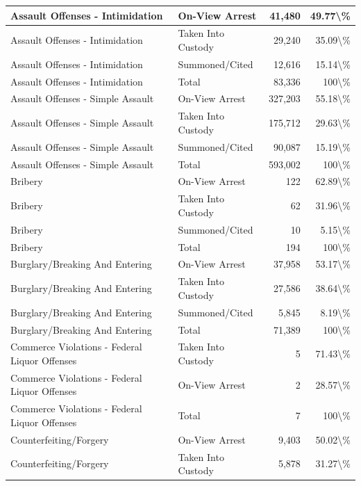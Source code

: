 \documentclass[
]{krantz}
\begin{document}
\begin{longtable}[t]{l|l|r|r}
\hline
Assault Offenses - Intimidation & On-View Arrest & 41,480 & 49.77\textbackslash{}\%\\
\hline
Assault Offenses - Intimidation & Taken Into Custody & 29,240 & 35.09\textbackslash{}\%\\
\hline
Assault Offenses - Intimidation & Summoned/Cited & 12,616 & 15.14\textbackslash{}\%\\
\hline
Assault Offenses - Intimidation & Total & 83,336 & 100\textbackslash{}\%\\
\hline
Assault Offenses - Simple Assault & On-View Arrest & 327,203 & 55.18\textbackslash{}\%\\
\hline
Assault Offenses - Simple Assault & Taken Into Custody & 175,712 & 29.63\textbackslash{}\%\\
\hline
Assault Offenses - Simple Assault & Summoned/Cited & 90,087 & 15.19\textbackslash{}\%\\
\hline
Assault Offenses - Simple Assault & Total & 593,002 & 100\textbackslash{}\%\\
\hline
Bribery & On-View Arrest & 122 & 62.89\textbackslash{}\%\\
\hline
Bribery & Taken Into Custody & 62 & 31.96\textbackslash{}\%\\
\hline
Bribery & Summoned/Cited & 10 & 5.15\textbackslash{}\%\\
\hline
Bribery & Total & 194 & 100\textbackslash{}\%\\
\hline
Burglary/Breaking And Entering & On-View Arrest & 37,958 & 53.17\textbackslash{}\%\\
\hline
Burglary/Breaking And Entering & Taken Into Custody & 27,586 & 38.64\textbackslash{}\%\\
\hline
Burglary/Breaking And Entering & Summoned/Cited & 5,845 & 8.19\textbackslash{}\%\\
\hline
Burglary/Breaking And Entering & Total & 71,389 & 100\textbackslash{}\%\\
\hline
Commerce Violations - Federal Liquor Offenses & Taken Into Custody & 5 & 71.43\textbackslash{}\%\\
\hline
Commerce Violations - Federal Liquor Offenses & On-View Arrest & 2 & 28.57\textbackslash{}\%\\
\hline
Commerce Violations - Federal Liquor Offenses & Total & 7 & 100\textbackslash{}\%\\
\hline
Counterfeiting/Forgery & On-View Arrest & 9,403 & 50.02\textbackslash{}\%\\
\hline
Counterfeiting/Forgery & Taken Into Custody & 5,878 & 31.27\textbackslash{}\%\\

\end{longtable}
\end{document}
